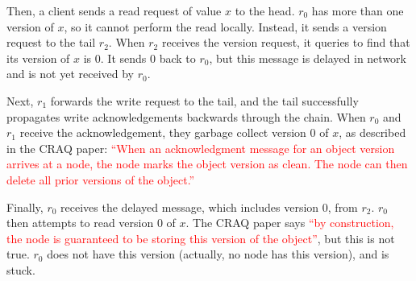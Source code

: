 \documentclass[12pt]{article}
\begin{document}
Then, a client sends a read request of value $x$ to the head. $r_0$ has more
than one version of $x$, so it cannot perform the read locally. Instead, it
sends a version request to the tail $r_2$. When $r_2$ receives the version
request, it queries to find that its version of $x$ is $0$. It sends $0$ back
to $r_0$, but this message is delayed in network and is not yet received by
$r_0$.
\begin{center}
\end{center}

Next, $r_1$ forwards the write request to the tail, and the tail successfully
propagates write acknowledgements backwards through the chain. When $r_0$ and
$r_1$ receive the acknowledgement, they garbage collect version $0$ of $x$, as
described in the CRAQ paper:
\textcolor{red}{%
``When an acknowledgment message for an object version arrives at a node, the
  node marks the object version as clean. The node can then delete all prior
  versions of the object.''
}
\begin{center}
\end{center}

Finally, $r_0$ receives the delayed message, which includes version $0$, from
$r_2$. $r_0$ then attempts to read version $0$ of $x$. The CRAQ paper says
\textcolor{red}{``by construction, the node is guaranteed to be storing this
version of the object''}, but this is not true. $r_0$ does not have this
version (actually, no node has this version), and is stuck.
\begin{center}
\end{center}
\end{document}
